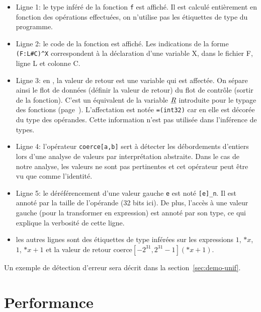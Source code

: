 \begin{itemize}
    \item Ligne 1: le type inféré de la fonction \texttt{f} est affiché. Il est
        calculé entièrement en fonction des opérations effectuées, on n'utilise
        pas les étiquettes de type du programme.

    \item Ligne 2: le code de la fonction est affiché. Les indications de la
        forme \texttt{(F:L\#C)\^{}X} correspondent à la déclaration d'une
        variable X, dans le fichier F, ligne L et colonne C.

    \item Ligne 3: en \newspeak, la valeur de retour est une variable qui est
        affectée. On sépare ainsi le flot de données (définir la valeur de
        retour) du flot de contrôle (sortir de la fonction). C'est un équivalent
        de la variable $\underline{R}$ introduite pour le typage des fonctions
        (page~\pageref{sec:typ-fun}). L'affectation est notée \texttt{=(int32)}
        car en \newspeak elle est décorée du type des opérandes. Cette
        information n'est pas utilisée dans l'inférence de types.

    \item Ligne 4: l'opérateur \texttt{coerce[a,b]} sert à détecter les
        débordements d'entiers lors d'une analyse de valeurs par interprétation
        abstraite. Dans le cas de notre analyse, les valeurs ne sont pas
        pertinentes et cet opérateur peut être vu que comme l'identité.

    \item Ligne 5: le déréférencement d'une valeur gauche \texttt{e} est noté
        \texttt{[e]\_n}. Il est annoté par la taille de l'opérande (32 bits
        ici). De plus, l'accès à une valeur gauche (pour la transformer en
        expression) est annoté par son type, ce qui explique la verbosité de
        cette ligne.

    \item les autres lignes sont des étiquettes de type inférées sur les
        expressions $1$, $*x$, $1$, $*x + 1$ et la valeur de retour
        $\mathrm{coerce}[-2^{31},2^{31}-1](*x + 1)$.

\end{itemize}

Un exemple de détection d'erreur sera décrit dans la section~\ref{sec:demo-unif}.

\section{Performance}

